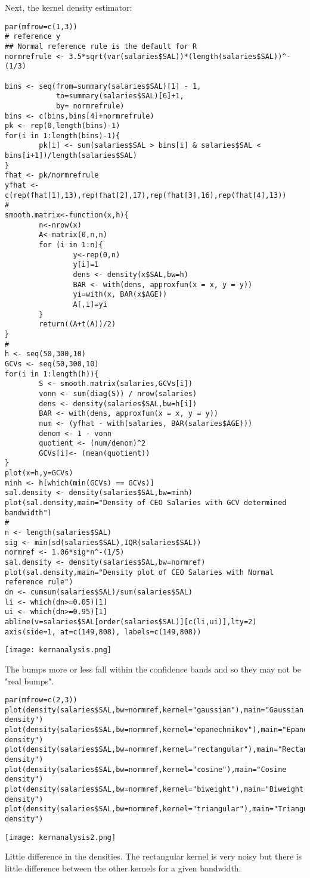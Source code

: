 \documentclass[11pt]{report}
\begin{document}
Next, the kernel density estimator:
\begin{verbatim}
par(mfrow=c(1,3))
# reference y
## Normal reference rule is the default for R
normrefrule <- 3.5*sqrt(var(salaries$SAL))*(length(salaries$SAL))^-(1/3)

bins <- seq(from=summary(salaries$SAL)[1] - 1,
            to=summary(salaries$SAL)[6]+1,
            by= normrefrule)
bins <- c(bins,bins[4]+normrefrule)
pk <- rep(0,length(bins)-1)
for(i in 1:length(bins)-1){
        pk[i] <- sum(salaries$SAL > bins[i] & salaries$SAL < bins[i+1])/length(salaries$SAL)
}
fhat <- pk/normrefrule
yfhat <- c(rep(fhat[1],13),rep(fhat[2],17),rep(fhat[3],16),rep(fhat[4],13))
#
smooth.matrix<-function(x,h){
        n<-nrow(x)
        A<-matrix(0,n,n)
        for (i in 1:n){
                y<-rep(0,n)
                y[i]=1
                dens <- density(x$SAL,bw=h)
                BAR <- with(dens, approxfun(x = x, y = y))
                yi=with(x, BAR(x$AGE))
                A[,i]=yi
        }
        return((A+t(A))/2)
}
#
h <- seq(50,300,10)
GCVs <- seq(50,300,10)
for(i in 1:length(h)){
        S <- smooth.matrix(salaries,GCVs[i])
        vonn <- sum(diag(S)) / nrow(salaries)
        dens <- density(salaries$SAL,bw=h[i])
        BAR <- with(dens, approxfun(x = x, y = y))
        num <- (yfhat - with(salaries, BAR(salaries$AGE)))
        denom <- 1 - vonn
        quotient <- (num/denom)^2
        GCVs[i]<- (mean(quotient))
}
plot(x=h,y=GCVs)
minh <- h[which(min(GCVs) == GCVs)]
sal.density <- density(salaries$SAL,bw=minh)
plot(sal.density,main="Density of CEO Salaries with GCV determined bandwidth")
#
n <- length(salaries$SAL)
sig <- min(sd(salaries$SAL),IQR(salaries$SAL))
normref <- 1.06*sig*n^-(1/5)
sal.density <- density(salaries$SAL,bw=normref)
plot(sal.density,main="Density plot of CEO Salaries with Normal reference rule")
dn <- cumsum(salaries$SAL)/sum(salaries$SAL)
li <- which(dn>=0.05)[1]
ui <- which(dn>=0.95)[1]
abline(v=salaries$SAL[order(salaries$SAL)][c(li,ui)],lty=2)
axis(side=1, at=c(149,808), labels=c(149,808))
\end{verbatim}

\texttt{[image: kernanalysis.png]}

The bumps more or less fall within the confidence bands and so they may not be "real bumps".

\begin{verbatim}
par(mfrow=c(2,3))
plot(density(salaries$SAL,bw=normref,kernel="gaussian"),main="Gaussian density")
plot(density(salaries$SAL,bw=normref,kernel="epanechnikov"),main="Epanechinkov density")
plot(density(salaries$SAL,bw=normref,kernel="rectangular"),main="Rectangular density")
plot(density(salaries$SAL,bw=normref,kernel="cosine"),main="Cosine density")
plot(density(salaries$SAL,bw=normref,kernel="biweight"),main="Biweight density")
plot(density(salaries$SAL,bw=normref,kernel="triangular"),main="Triangular density")
\end{verbatim}

\texttt{[image: kernanalysis2.png]}

Little difference in the densities. The rectangular kernel is very noisy but there is little difference between the other kernels for a given bandwidth.
\end{document}
